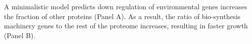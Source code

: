 \label{fig:model}
  A minimalistic model predicts down regulation of environmental genes increases the fraction of other proteins (Panel A).
As a result, the ratio of bio-synthesis machinery genes to the rest of the proteome increases, resulting in faster growth (Panel B).
